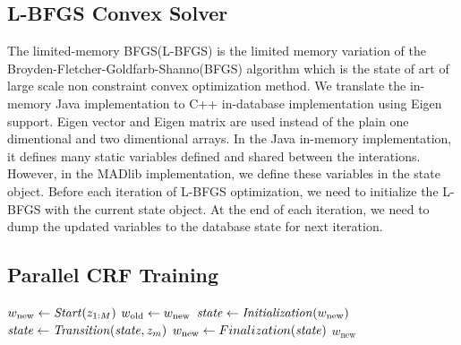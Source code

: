 \subsection{L-BFGS Convex Solver}
The limited-memory BFGS(L-BFGS) \cite{DBLP:journals/siamjo/MoralesN00} is the limited memory variation of the Broyden-Fletcher-Goldfarb-Shanno(BFGS) algorithm which
is the state of art of large scale non constraint convex optimization method.
We translate the in-memory Java implementation to C++ in-database implementation using Eigen support.
Eigen vector and Eigen matrix are used instead of the plain one dimentional and two dimentional arrays.
In the Java in-memory implementation, it defines many static variables defined and shared between the interations.
However, in the MADlib implementation, we define these variables in the state object.
Before each iteration of L-BFGS optimization, we need to initialize the L-BFGS with the current state object. 
At the end of each iteration, we need to dump the updated variables to the database state for next iteration.


\subsection{Parallel CRF Training}
\begin{algorithm} \label{alg:CRF training}
\begin{algorithmic}[1]
	\State $w_\text{new} \leftarrow \mathit{Start}(z_{1:M})$
	\Repeat
        \State $w_\text{old} \leftarrow w_\text{new}$
        \State $\mathit{state} \leftarrow \mathit{Initialization}(w_\text{new})$
		 
			\State $\mathit{state} \leftarrow \mathit{Transition}(\mathit{state}, z_m)$
		\EndFor
		\State $w_\text{new} \leftarrow Finalization(\mathit{state})$ 
    \State \Return $w_\text{new}$
\end{algorithmic}
\end{algorithm}

